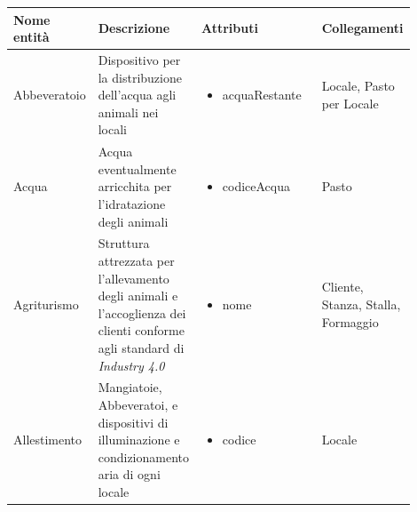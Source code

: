 \documentclass[12pt,a4paper]{article}
\begin{document}
\begin{center}

\setlength{\extrarowheight}{1.5pt}

\begin{longtable}{|p{0.14\linewidth}|p{0.20\linewidth}|p{0.36\linewidth}|p{0.20\linewidth}|}
\hline 
\textbf{Nome entità} 	& \textbf{Descrizione} & \textbf{Attributi} & \textbf{Collegamenti}\\ 

    
\hline
Abbevera\-toio 		&  Dispositivo per la distribuzione dell'acqua agli animali nei locali 
					& \begin{itemize}
						\setlength{\itemindent}{-1em}
						\vspace{-15pt}
						\setlength\itemsep{-0.25em}
						\item acquaRestante
						
					\end{itemize}
					&  Locale, Pasto per Locale \\

\hline
Acqua 				&  Acqua eventualmente arricchita per l'idratazione degli animali 
					& \begin{itemize}
						\setlength{\itemindent}{-1em}
						\vspace{-25pt}
						\setlength\itemsep{-0.25em}
						\item codiceAcqua
					\end{itemize}
					&  Pasto \\

\hline
Agrituri\-smo 			&  Struttura attrezzata per l'allevamento degli animali e l'accoglienza dei clienti conforme agli standard di \textit{Industry 4.0}  
					& \begin{itemize}
						\setlength{\itemindent}{-1em}
						\vspace{-25pt}
						\setlength\itemsep{-0.25em}
						\item nome
					\end{itemize}
					&  Cliente, Stanza, Stalla, Formaggio  \\

\hline
Allestimen\-to 		&  Mangiatoie, Abbeveratoi, e dispositivi di illuminazione e condizionamento aria di ogni locale 
					& \begin{itemize}
						\setlength{\itemindent}{-1em}
						\vspace{-25pt}
						\setlength\itemsep{-0.25em}
						\item codice
						
					\end{itemize}
					&  Locale \\


\end{longtable}
\end{center}
\end{document}
